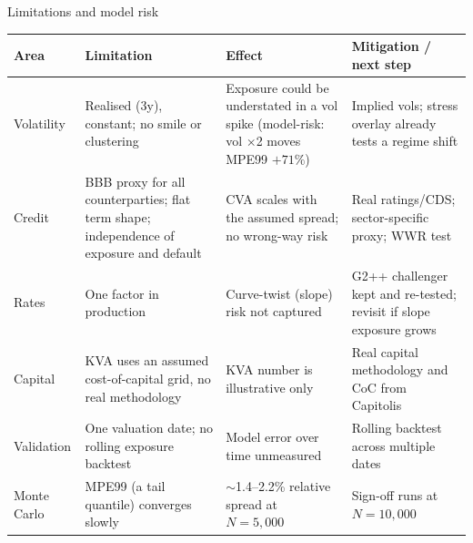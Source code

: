 \documentclass[8pt,aspectratio=169]{beamer}
\begin{document}
\begin{frame}{Limitations and model risk}
  \scriptsize
  \begin{tabular}{p{}p{}p{}p{}}
    \toprule
    \textbf{Area} & \textbf{Limitation} & \textbf{Effect} & \textbf{Mitigation / next step} \\
    \midrule
    Volatility & Realised (3y), constant; no smile or clustering & Exposure could be understated in a vol spike (model-risk: vol $\times$2 moves MPE99 $+71\%$) & Implied vols; stress overlay already tests a regime shift \\
    Credit & BBB proxy for all counterparties; flat term shape; independence of exposure and default & CVA scales with the assumed spread; no wrong-way risk & Real ratings/CDS; sector-specific proxy; WWR test \\
    Rates & One factor in production & Curve-twist (slope) risk not captured & G2++ challenger kept and re-tested; revisit if slope exposure grows \\
    Capital & KVA uses an assumed cost-of-capital grid, no real methodology & KVA number is illustrative only & Real capital methodology and CoC from Capitolis \\
    Validation & One valuation date; no rolling exposure backtest & Model error over time unmeasured & Rolling backtest across multiple dates \\
    Monte Carlo & MPE99 (a tail quantile) converges slowly & $\sim$1.4--2.2\% relative spread at $N{=}5{,}000$ & Sign-off runs at $N{=}10{,}000$ \\
    \bottomrule
  \end{tabular}
\end{frame}
\end{document}
